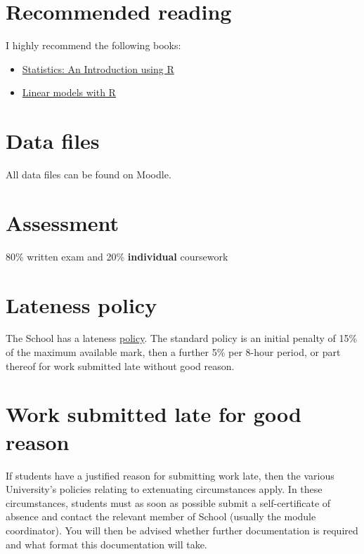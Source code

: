 \documentclass[
  british,
  oneside]{krantz}
\providecommand{\tightlist}{%
  \setlength{\itemsep}{0pt}\setlength{\parskip}{0pt}}
\theoremstyle{definition}
\theoremstyle{definition}
\theoremstyle{definition}
\theoremstyle{definition}
\theoremstyle{remark}
\begin{document}
\hypertarget{recommended-reading}{%
\section*{Recommended reading}\label{recommended-reading}}


I highly recommend the following books:

\begin{itemize}
\tightlist
\item
  \href{https://www.wiley.com/en-gb/Statistics\%3A+An+Introduction+using+R-p-9780470022986}{Statistics: An Introduction using R}
\item
  \href{https://www.crcpress.com/Linear-Models-with-R/Faraway/p/book/9781439887332}{Linear models with R}
\end{itemize}

\hypertarget{data-files}{%
\section*{Data files}\label{data-files}}


All data files can be found on Moodle.

\hypertarget{assessment}{%
\section*{Assessment}\label{assessment}}


80\% written exam and 20\% \textbf{individual} coursework

\hypertarget{lateness-policy}{%
\section*{Lateness policy}\label{lateness-policy}}


The School has a lateness \href{https://www.st-andrews.ac.uk/maths/current/ug/information/latepenalties/}{policy}. The standard policy is an initial penalty of 15\% of the maximum available mark, then a further 5\% per 8-hour period, or part thereof for work submitted late without good reason.

\hypertarget{work-submitted-late-for-good-reason}{%
\section*{Work submitted late for good reason}\label{work-submitted-late-for-good-reason}}


If students have a justified reason for submitting work late, then the various University's policies relating to extenuating circumstances apply. In these circumstances, students must as soon as possible submit a self-certificate of absence and contact the relevant member of School (usually the module coordinator). You will then be advised whether further documentation is required and what format this documentation will take.
\end{document}
